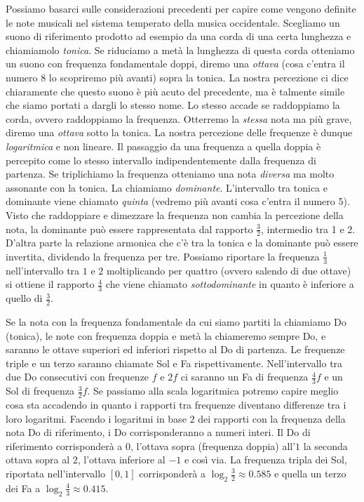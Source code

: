 Possiamo basarci sulle considerazioni precedenti per capire come vengono definite 
le note musicali nel sistema temperato della musica occidentale.
Scegliamo un suono di riferimento prodotto ad esempio da una corda di una 
certa lunghezza e chiamiamolo \emph{tonica}.
Se riduciamo a metà la lunghezza di questa corda otteniamo un suono 
con frequenza fondamentale doppi, diremo una \emph{ottava} (cosa c'entra il numero 8 lo scopriremo 
più avanti) sopra la tonica.
La nostra percezione ci dice chiaramente che questo suono è più acuto 
del precedente, ma è talmente simile che siamo portati a dargli lo stesso nome. 
Lo stesso accade se raddoppiamo la corda, ovvero raddoppiamo la frequenza. 
Otterremo la \emph{stessa} nota ma più grave, diremo una \emph{ottava} sotto la tonica. 
La nostra percezione delle frequenze è dunque \emph{logaritmica} e non lineare.
Il passaggio da una frequenza a quella doppia è percepito come lo stesso intervallo 
indipendentemente dalla frequenza di partenza. 
Se triplichiamo la frequenza otteniamo una nota \emph{diversa} ma molto assonante 
con la tonica. La chiamiamo \emph{dominante}.
L'intervallo tra tonica e dominante viene chiamato \emph{quinta} (vedremo più avanti cosa 
c'entra il numero 5).
Visto che raddoppiare e dimezzare la frequenza non cambia la percezione della nota,
la dominante può essere rappresentata dal rapporto $\frac 3 2$, intermedio tra 1 e 2.
D'altra parte la relazione armonica che c'è tra la tonica e la dominante 
può essere invertita, dividendo la frequenza per tre. 
Possiamo riportare la frequenza $\frac 1 3$ nell'intervallo tra $1$ e $2$ 
moltiplicando per quattro (ovvero salendo di due ottave) si ottiene 
il rapporto $\frac 4 3$ che viene chiamato \emph{sottodominante}
in quanto è inferiore a quello di $\frac 3 2$.

Se la nota con la frequenza fondamentale da cui siamo partiti la chiamiamo Do
(tonica), 
le note con frequenza doppia e metà la chiameremo sempre Do, e saranno le ottave 
superiori ed inferiori rispetto al Do di partenza. 
Le frequenze triple e un terzo saranno chiamate Sol e Fa rispettivamente.
Nell'intervallo tra due Do consecutivi con frequenze $f$ e $2f$ ci saranno un Fa
di frequenza $\frac 4 3 f$ e un Sol di frequenza $\frac 3 2 f$. 
Se passiamo alla scala logaritmica potremo capire meglio cosa sta accadendo in quanto 
i rapporti tra frequenze diventano differenze tra i loro logaritmi.
Facendo i logaritmi in base $2$ dei rapporti con la frequenza della nota Do 
di riferimento, i Do corrisponderanno a numeri interi. 
Il Do di riferimento
corrisponderà a $0$, l'ottava sopra (frequenza doppia) all'$1$ la seconda ottava sopra al $2$,
l'ottava inferiore al $-1$ e così via.
La frequenza tripla dei Sol, riportata nell'intervallo $[0,1]$ corrisponderà a 
$\log_2\frac 3 2 \approx 0.585$
e quella un terzo dei Fa a $\log_2 \frac 4 3 \approx 0.415$.

